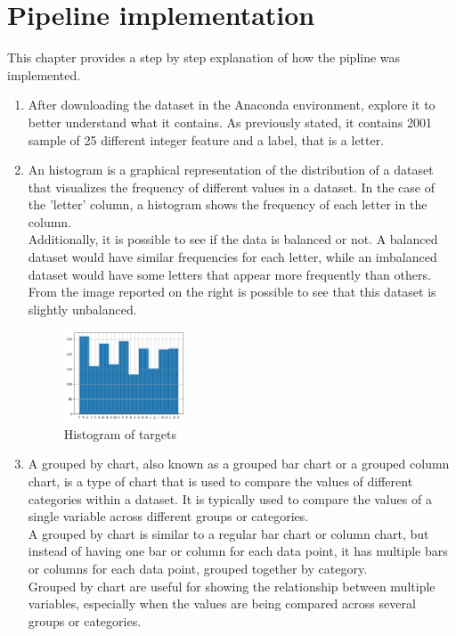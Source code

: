 \documentclass{article}
\begin{document}
\section{Pipeline implementation}
This chapter provides a step by step explanation of how the pipline was implemented.
\begin{enumerate}
    \item After downloading the dataset in the Anaconda environment, explore it to better understand what it contains. As previously stated, it contains 2001 sample of 25 different integer feature and a label, that is a letter.
    \item \begin{multicols}{2}
    An histogram is a graphical representation of the distribution of a dataset that visualizes the frequency of different values in a dataset. In the case of the 'letter' column, a histogram shows the frequency of each letter in the column.\\ Additionally, it is possible to see if the data is balanced or not. A balanced dataset would have similar frequencies for each letter, while an imbalanced dataset would have some letters that appear more frequently than others.\\From the image reported on the right is possible to see that this dataset is slightly unbalanced.
        \columnbreak
        \begin{figure}[H]
            \begin{center}
            \includegraphics[width=0.34\textwidth]{histogram.png}
            \caption{Histogram of targets}
            \label{fig:hist}
            \end{center}
        \end{figure} 
    \end{multicols}
    \item \begin{multicols}{2}A grouped by chart, also known as a grouped bar chart or a grouped column chart, is a type of chart that is used to compare the values of different categories within a dataset. It is typically used to compare the values of a single variable across different groups or categories.\\ A grouped by chart is similar to a regular bar chart or column chart, but instead of having one bar or column for each data point, it has multiple bars or columns for each data point, grouped together by category.\\Grouped by chart are useful for showing the relationship between multiple variables, especially when the values are being compared across several groups or categories.

\end{multicols}
\end{enumerate}
\end{document}
